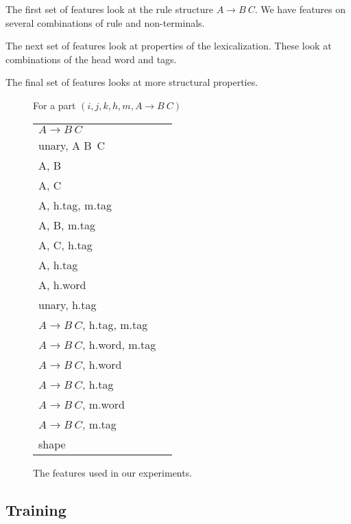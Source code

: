 \documentclass[11pt,letterpaper]{article}
\begin{document}
The first set of features look at the rule structure $A \rightarrow B\ C$.
We have features on several combinations of rule and non-terminals.

The next set of features look at properties of the lexicalization.
These look at combinations of the head word and tags.

The final set of features looks at more structural properties.




\cite{}
\cite{}
\cite{}



\begin{figure}
  \centering
  For a part $(i, j, k, h, m, A \rightarrow B\ C)$
  \begin{tabular}{ll}

  $A \rightarrow B\ C$\\
  unary, A B\ C\\
  A, B \\
  A, C \\

  A, h.tag, m.tag \\
  A, B, m.tag \\
  A, C, h.tag \\
  A, h.tag \\
  A, h.word \\
  unary, h.tag \\

  $A \rightarrow B\ C$, h.tag, m.tag \\
  $A \rightarrow B\ C$, h.word, m.tag \\
  $A \rightarrow B\ C$, h.word \\
  $A \rightarrow B\ C$, h.tag \\
  $A \rightarrow B\ C$, m.word \\
  $A \rightarrow B\ C$, m.tag \\

  shape\\

  \end{tabular}

  \label{fig:features}
  \caption{The features used in our experiments.}
\end{figure}

\subsection{Training}
\end{document}
